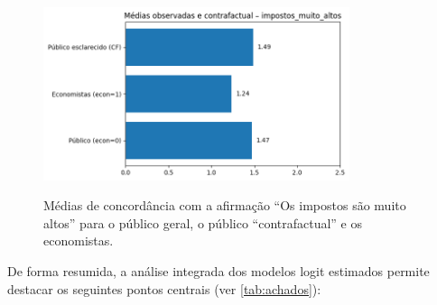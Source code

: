 \begin{figure}[htbp]
\centering
\caption{Médias de concordância com a afirmação ``Os impostos são muito altos'' para o público geral, o público ``contrafactual'' e os economistas.}
\includegraphics[width=0.8\textwidth]{Textuais/analise/imagens/impostos_muito_altos.png}
\notafig
\label{fig:impostos}
\end{figure}

De forma resumida, a análise integrada dos modelos logit estimados permite destacar os seguintes pontos centrais (ver \autoref{tab:achados}): 

